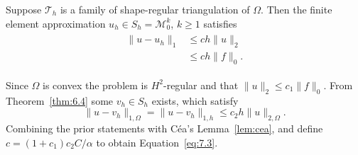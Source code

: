 \begin{thmx}{\quad}
    Suppose $\mathcal{T}_h$ is a family of shape-regular triangulation of $\Omega$. 
    Then the finite element approximation $u_h\in S_h = \mathcal{M}^k_0$, $k\geq 1$ satisfies
    \begin{align}
        \begin{split}
            \|u-u_h\|_1&\leq ch\|u\|_2\ \\
            &\leq ch\|f\|_0.
        \end{split}
        \label{eq:7.3}
    \end{align}\label{thm:7.3}
\end{thmx}
\begin{bev}
    Since $\Omega$ is convex the problem is $H^2$-regular and that $\|u\|_2 \leq c_1\|f\|_0$.
    From Theorem~\ref{thm:6.4} some $v_h\in S_h$ exists, which satisfy 
    \begin{equation}
    \|u-v_h\|_{1,\Omega} = \|u-v_h\|_{1,h} \leq c_2h\|u\|_{2,\Omega}.
    \end{equation}
    Combining the prior statements with Céa's Lemma~\ref{lem:cea}, and 
    define $c = (1+c_1)c_2C/\alpha$ 
    to obtain Equation~\ref{eq:7.3}.
\end{bev}